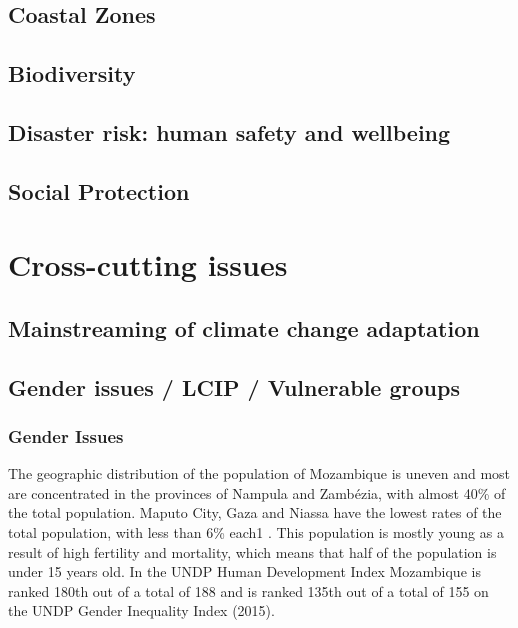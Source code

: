 \documentclass[
]{book}
\begin{document}
\hypertarget{coastal-zones}{%
\section{Coastal Zones}\label{coastal-zones}}

\hypertarget{biodiversity}{%
\section{Biodiversity}\label{biodiversity}}

\hypertarget{disaster-risk-human-safety-and-wellbeing}{%
\section{Disaster risk: human safety and wellbeing}\label{disaster-risk-human-safety-and-wellbeing}}

\hypertarget{social-protection}{%
\section{Social Protection}\label{social-protection}}

\hypertarget{cross-cutting-issues}{%
\chapter{Cross-cutting issues}\label{cross-cutting-issues}}

\hypertarget{mainstreaming-of-climate-change-adaptation}{%
\section{Mainstreaming of climate change adaptation}\label{mainstreaming-of-climate-change-adaptation}}

\hypertarget{gender-issues-lcip-vulnerable-groups}{%
\section{Gender issues / LCIP / Vulnerable groups}\label{gender-issues-lcip-vulnerable-groups}}

\hypertarget{gender-issues}{%
\subsection{Gender Issues}\label{gender-issues}}

The geographic distribution of the population of Mozambique is uneven and most are concentrated in the provinces of Nampula and Zambézia, with almost 40\% of the total population. Maputo City, Gaza and Niassa have the lowest rates of the total population, with less than 6\% each1 . This population is mostly young as a result of high fertility and mortality, which means that half of the population is under 15 years old. In the UNDP Human Development Index Mozambique is ranked 180th out of a total of 188 and is ranked 135th out of a total of 155 on the UNDP Gender Inequality Index (2015).
\end{document}
